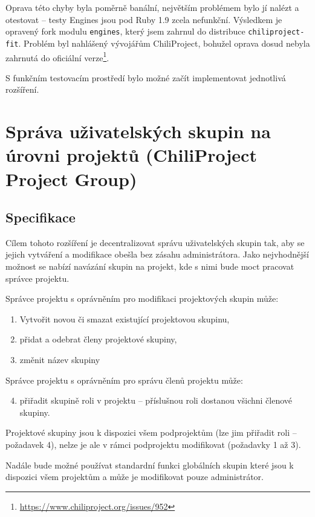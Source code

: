 \documentclass[thesis=B,czech]{FITthesis}[2012/05/02]
\begin{document}
Oprava této chyby byla poměrně banální, největším problémem bylo jí
nalézt a otestovat -- testy Engines jsou pod Ruby 1.9 zcela nefunkční.
Výsledkem je opravený \gls{fork} modulu \lstinline!engines!, který jsem
zahrnul do distribuce \lstinline!chiliproject-fit!. Problém byl
nahlášený vývojářům ChiliProject, bohužel oprava dosud nebyla zahrnutá
do oficiální verze\footnote{\url{https://www.chiliproject.org/issues/952}}.

S funkčním testovacím prostředí bylo možné začít implementovat
jednotlivá rozšíření.

\section{Správa uživatelských skupin na úrovni projektů (ChiliProject
Project Group)}
\label{sec:project_group}

\subsection{Specifikace}

Cílem tohoto rozšíření je decentralizovat správu uživatelských skupin
tak, aby se jejich vytváření a modifikace obešla bez zásahu
administrátora. Jako nejvhodnější možnost se nabízí navázání skupin na
projekt, kde s nimi bude moct pracovat správce projektu.

Správce projektu s oprávněním pro modifikaci projektových skupin může:

\begin{enumerate}[1.]
\item
  Vytvořit novou či smazat existující projektovou skupinu,
\item
  přidat a odebrat členy projektové skupiny,
\item
  změnit název skupiny
\end{enumerate}
Správce projektu s oprávněním pro správu členů projektu může:

\begin{enumerate}[1.]
\setcounter{enumi}{3}
\item
  přiřadit skupině roli v projektu -- příslušnou roli dostanou všichni
  členové skupiny.
\end{enumerate}
Projektové skupiny jsou k dispozici všem podprojektům (lze jim přiřadit
roli -- požadavek 4), nelze je ale v rámci podprojektu modifikovat
(požadavky 1 až 3).

Nadále bude možné používat standardní funkci globálních skupin které
jsou k dispozici všem projektům a může je modifikovat pouze
administrátor.
\end{document}
